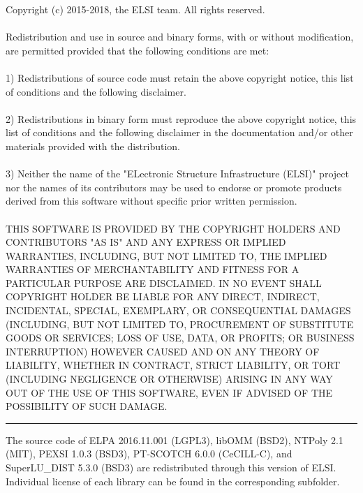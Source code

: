 \documentclass{report}
\begin{document}
Copyright (c) 2015-2018, the ELSI team.  All rights reserved.\\
\\
Redistribution and use in source and binary forms, with or without modification, are permitted provided that the following conditions are met:\\
\\
1) Redistributions of source code must retain the above copyright notice, this list of conditions and the following disclaimer.\\
\\
2) Redistributions in binary form must reproduce the above copyright notice, this list of conditions and the following disclaimer in the documentation and/or other materials provided with the distribution.\\
\\
3) Neither the name of the "ELectronic Structure Infrastructure (ELSI)" project nor the names of its contributors may be used to endorse or promote products derived from this software without specific prior written permission.\\
\\
THIS SOFTWARE IS PROVIDED BY THE COPYRIGHT HOLDERS AND CONTRIBUTORS "AS IS" AND ANY EXPRESS OR IMPLIED WARRANTIES, INCLUDING, BUT NOT LIMITED TO, THE IMPLIED WARRANTIES OF MERCHANTABILITY AND FITNESS FOR A PARTICULAR PURPOSE ARE DISCLAIMED.  IN NO EVENT SHALL COPYRIGHT HOLDER BE LIABLE FOR ANY DIRECT, INDIRECT, INCIDENTAL, SPECIAL, EXEMPLARY, OR CONSEQUENTIAL DAMAGES (INCLUDING, BUT NOT LIMITED TO, PROCUREMENT OF SUBSTITUTE GOODS OR SERVICES; LOSS OF USE, DATA, OR PROFITS; OR BUSINESS INTERRUPTION) HOWEVER CAUSED AND ON ANY THEORY OF LIABILITY, WHETHER IN CONTRACT, STRICT LIABILITY, OR TORT (INCLUDING NEGLIGENCE OR OTHERWISE) ARISING IN ANY WAY OUT OF THE USE OF THIS SOFTWARE, EVEN IF ADVISED OF THE POSSIBILITY OF SUCH DAMAGE.\\
\bigskip
\bigskip
\noindent\rule{18cm}{0.4pt}

The source code of ELPA 2016.11.001 (LGPL3), libOMM (BSD2), NTPoly 2.1 (MIT), PEXSI 1.0.3 (BSD3), PT-SCOTCH 6.0.0 (CeCILL-C), and SuperLU\_DIST 5.3.0 (BSD3) are redistributed through this version of ELSI.  Individual license of each library can be found in the corresponding subfolder.\\
\end{document}
